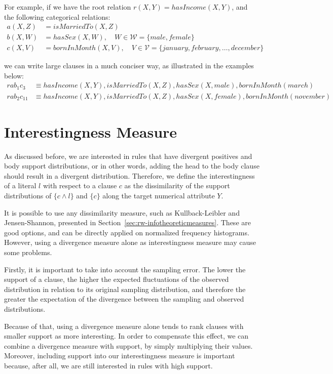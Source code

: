 For example, if we have the root relation $r(X,Y)=hasIncome(X,Y)$, and the following categorical relations:
\begin{align*}
a(X,Z)&=isMarriedTo(X,Z) \\
b(X,W)&=hasSex(X,W), \quad W \in \mathcal{W} =\{male,female\} \\
c(X,V)&=bornInMonth(X,V), \quad V \in \mathcal{V} =\{january,february,\ldots,december\}
\end{align*}

we can write large clauses in a much conciser way, as illustrated in the examples below:
\begin{align*}
rab_1c_3 &\equiv hasIncome(X,Y),isMarriedTo(X,Z),hasSex(X,male),bornInMonth(march) \\
rab_2c_{11} &\equiv hasIncome(X,Y),isMarriedTo(X,Z),hasSex(X,female),bornInMonth(november)
\end{align*}

\section{Interestingness Measure}

As discussed before, we are interested in rules that have divergent positives and body support distributions, or in
other words, adding the head to the body clause should result in a divergent distribution. Therefore, we define the
interestingness of a literal $l$ with respect to a clause $c$ as the
dissimilarity of the support distributions of $\{c \wedge l\}$ and $\{c\}$ along the target numerical attribute $Y$.

It is possible to use any dissimilarity measure, such as Kullback-Leibler and Jensen-Shannon, presented
in Section~\ref{sec:rw-infotheoreticmeasures}. These are good options, and can be directly applied on normalized
frequency histograms. However, using a divergence measure alone as interestingness measure may cause some problems.

Firstly, it is important to take into account the sampling error. The lower the support of a clause, the higher the
expected fluctuations of the observed distribution in relation to its original sampling distribution, and therefore the
greater the expectation of the divergence between the sampling and observed distributions.

Because of that, using a divergence measure alone tends to rank clauses with smaller support as more interesting. In
order to compensate this effect, we can combine a divergence measure with support, by simply multiplying their
values. Moreover, including support into our interestingness measure is important because, after all, we are still
interested in rules with high support.

